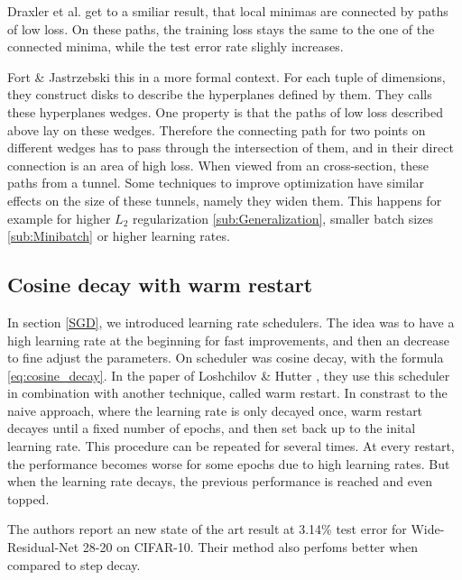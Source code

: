 Draxler et al. \cite{draxler2018essentially} get to a smiliar result, that local
minimas are connected by paths of low loss. On these paths, the training loss stays the
same to the one of the connected minima, while the test error rate slighly
increases.

Fort \& Jastrzebski \cite{fort2019large}  this in a more formal context. For
each tuple of dimensions, they construct disks to describe the hyperplanes
defined by them. They calls these hyperplanes wedges. One property is that the
paths of low loss described above lay on these wedges. Therefore the
connecting path for two points on different wedges has to pass through the
intersection of them, and in their direct connection is an area of high loss.
When viewed from an cross-section, these paths from a tunnel. Some techniques
to improve optimization have similar effects on the size of these tunnels,
namely they widen them. This happens for example for higher $L_2$ regularization
\ref{sub:Generalization}, smaller batch sizes \ref{sub:Minibatch} or higher
learning rates.


\subsection{Cosine decay with warm restart}\label{sub:cosine_decay}

In section \ref{SGD}, we introduced learning rate schedulers. The idea was to
have a high learning rate at the beginning for fast improvements, and then an
decrease to fine adjust the parameters. On scheduler was cosine decay, with the
formula \ref{eq:cosine_decay}. In the paper of Loshchilov \& Hutter
\cite{loshchilov2016sgdr}, they use this scheduler in combination with another
technique, called warm restart. In constrast to the naive approach, where the
learning rate is only decayed once, warm restart decayes until a fixed number of
epochs, and then set back up to the inital learning rate. This procedure can be
repeated for several times. At every restart, the performance becomes worse for
some epochs due to high learning rates. But when the learning rate decays, the
previous performance is reached and even topped.

The authors report an new state of the art result at 3.14\% test error for
Wide-Residual-Net 28-20 on CIFAR-10. Their method also perfoms better when
compared to step decay. 


